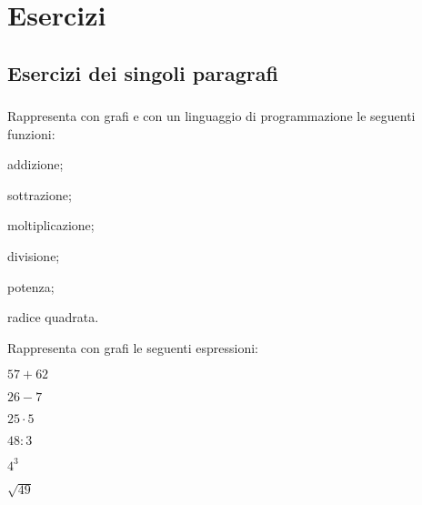 
\section{Esercizi}

\subsection{Esercizi dei singoli paragrafi}

\subsubsection*{}

\begin{esercizio}
\label{ese:1.1}
Rappresenta con grafi e con un linguaggio di programmazione le seguenti
funzioni:
\begin{multicols}{3}
 \begin{enumeratea}
 \item addizione;
 \item sottrazione;
 \item moltiplicazione;
 \item divisione;
 \item potenza;
 \item radice quadrata.
 \end{enumeratea}
\end{multicols}
\end{esercizio}

\begin{esercizio}
\label{ese:1.1}
Rappresenta con grafi le seguenti espressioni:
\begin{multicols}{3}
 \begin{enumeratea}
 \item \(57 + 62\)
 \item \(26 - 7\)
 \item \(25 \cdot 5\)
 \item \(48 : 3\)
 \item \(4^3\)
 \item \(\sqrt{49}\)
 \end{enumeratea}
\end{multicols}
\end{esercizio}

